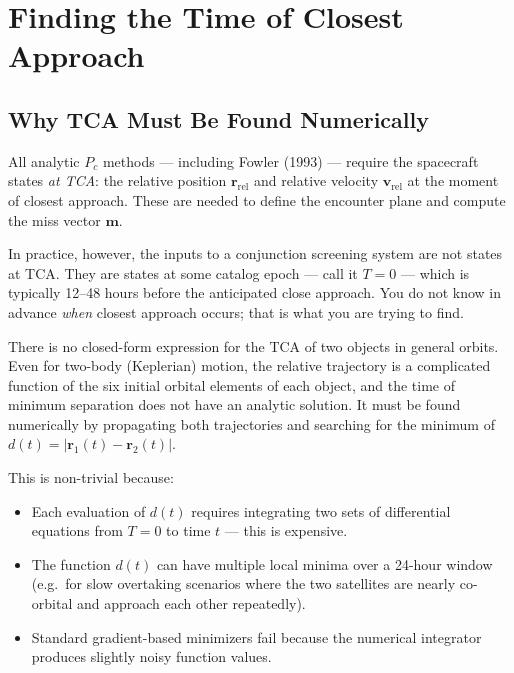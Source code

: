 \documentclass[11pt]{article}
\begin{document}
\section{Finding the Time of Closest Approach}
\label{sec:tca}

\subsection{Why TCA Must Be Found Numerically}

All analytic $P_c$ methods — including Fowler (1993) — require the spacecraft
states \emph{at TCA}: the relative position $\mathbf{r}_\text{rel}$ and relative
velocity $\mathbf{v}_\text{rel}$ at the moment of closest approach.  These are
needed to define the encounter plane and compute the miss vector $\mathbf{m}$.

In practice, however, the inputs to a conjunction screening system are not states
at TCA.  They are states at some catalog epoch — call it $T{=}0$ — which is
typically 12--48 hours before the anticipated close approach.  You do not know in
advance \emph{when} closest approach occurs; that is what you are trying to find.

There is no closed-form expression for the TCA of two objects in general orbits.
Even for two-body (Keplerian) motion, the relative trajectory is a complicated
function of the six initial orbital elements of each object, and the time of
minimum separation does not have an analytic solution.  It must be found
numerically by propagating both trajectories and searching for the minimum
of $d(t) = |\mathbf{r}_1(t) - \mathbf{r}_2(t)|$.

This is non-trivial because:
\begin{itemize}
  \item Each evaluation of $d(t)$ requires integrating two sets of differential
        equations from $T{=}0$ to time $t$ — this is expensive.
  \item The function $d(t)$ can have multiple local minima over a 24-hour window
        (e.g.\ for slow overtaking scenarios where the two satellites are nearly
        co-orbital and approach each other repeatedly).
  \item Standard gradient-based minimizers fail because the numerical integrator
        produces slightly noisy function values.
\end{itemize}
\end{document}
